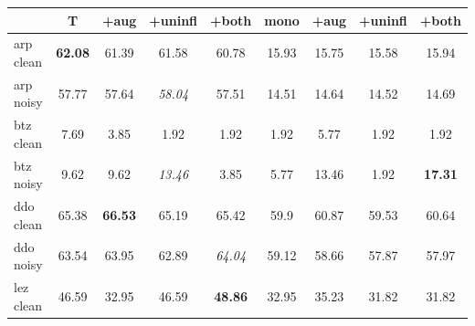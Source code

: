 \begin{table}
    \centering
    \setlength{\tabcolsep}{8.pt}
    \begin{tabular}{l|cccc|cccc}
      \textbf{} & \textbf{T} & \textbf{+aug} & \textbf{+uninfl} & \textbf{+both} & \textbf{mono} &  \textbf{+aug} &
      \textbf{+uninfl} &
      \textbf{+both} \\ 
       \hline
      arp clean & \textbf{62.08} & 61.39 & 61.58          & 60.78 & 15.93 & 15.75 & 15.58 & 15.94 \\
      arp noisy & 57.77          & 57.64 & \textit{58.04} & 57.51 & 14.51 & 14.64 & 14.52 & 14.69 \\
      \hline
      btz clean & 7.69 & 3.85 & 1.92 & 1.92 & 1.92 & 5.77 & 1.92 & 1.92  \\
      btz noisy & 9.62 & 9.62 & \textit{13.46} & 3.85 & 5.77 & 13.46 & 1.92 & \textbf{17.31}  \\
      \hline
      ddo clean & 65.38 & \textbf{66.53} & 65.19 & 65.42          & 59.9 & 60.87 & 59.53 & 60.64  \\
      ddo noisy & 63.54 & 63.95          & 62.89 & \textit{64.04} & 59.12 & 58.66 & 57.87 & 57.97 \\
      \hline
      lez clean & 46.59          & 32.95 & 46.59 & \textbf{48.86} & 32.95 & 35.23 & 31.82 & 31.82 \\

\end{tabular}
\end{table}
